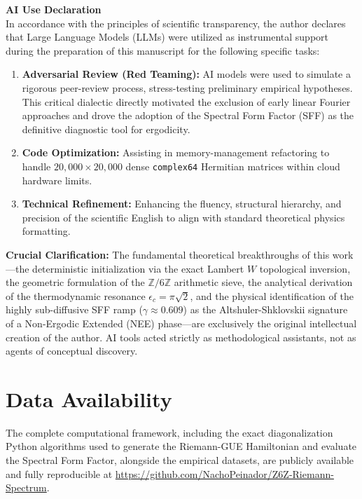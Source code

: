 \documentclass[aps,prl,preprint,superscriptaddress,floatfix]{revtex4-2}
\begin{document}
\vspace{0.3cm}
\noindent \textbf{AI Use Declaration} \\
In accordance with the principles of scientific transparency, the author declares that Large Language Models (LLMs) were utilized as instrumental support during the preparation of this manuscript for the following specific tasks:

\begin{enumerate}
    \item \textbf{Adversarial Review (Red Teaming):} AI models were used to simulate a rigorous peer-review process, stress-testing preliminary empirical hypotheses. This critical dialectic directly motivated the exclusion of early linear Fourier approaches and drove the adoption of the Spectral Form Factor (SFF) as the definitive diagnostic tool for ergodicity.
    \item \textbf{Code Optimization:} Assisting in memory-management refactoring to handle $20,000 \times 20,000$ dense \texttt{complex64} Hermitian matrices within cloud hardware limits.
    \item \textbf{Technical Refinement:} Enhancing the fluency, structural hierarchy, and precision of the scientific English to align with standard theoretical physics formatting.
\end{enumerate}

\textbf{Crucial Clarification:} The fundamental theoretical breakthroughs of this work—the deterministic initialization via the exact Lambert $W$ topological inversion, the geometric formulation of the $\mathbb{Z}/6\mathbb{Z}$ arithmetic sieve, the analytical derivation of the thermodynamic resonance $\epsilon_c = \pi\sqrt{2}$, and the physical identification of the highly sub-diffusive SFF ramp ($\gamma \approx 0.609$) as the Altshuler-Shklovskii signature of a Non-Ergodic Extended (NEE) phase—are exclusively the original intellectual creation of the author. AI tools acted strictly as methodological assistants, not as agents of conceptual discovery.


\section{Data Availability}
The complete computational framework, including the exact diagonalization Python algorithms used to generate the Riemann-GUE Hamiltonian and evaluate the Spectral Form Factor, alongside the empirical datasets, are publicly available and fully reproducible at \url{https://github.com/NachoPeinador/Z6Z-Riemann-Spectrum}.
\end{document}
